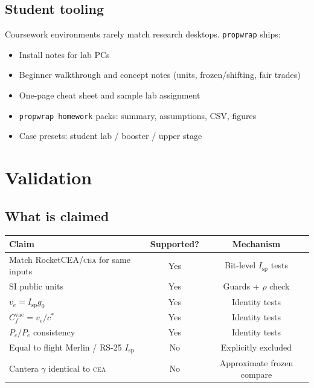 \documentclass[11pt,a4paper]{report}
\newcommand{\pw}{\texttt{propwrap}}
\newcommand{\cea}{\textsc{cea}}
\newcommand{\Isp}{I_{\mathrm{sp}}}
\newcommand{\cstar}{c^{*}}
\newcommand{\Cf}{C_{f}}
\newcommand{\ve}{v_{e}}
\newcommand{\Pc}{P_{c}}
\newcommand{\Pe}{P_{e}}
\newcommand{\gzero}{g_{0}}
\begin{document}
\section{Student tooling}

Coursework environments rarely match research desktops. \pw{} ships:

\begin{itemize}[leftmargin=*]
  \item Install notes for lab PCs
  \item Beginner walkthrough and concept notes (units, frozen/shifting, fair trades)
  \item One-page cheat sheet and sample lab assignment
  \item \texttt{propwrap homework} packs: summary, assumptions, CSV, figures
  \item Case presets: student lab / booster / upper stage
\end{itemize}

\chapter{Validation}
\label{ch:validation}

\section{What is claimed}

\begin{center}
\begin{tabular}{@{}p{7.2cm}cc@{}}
\toprule
Claim & Supported? & Mechanism \\
\midrule
Match RocketCEA/\cea{} for same inputs & Yes & Bit-level $\Isp$ tests \\
SI public units & Yes & Guards + $\rho$ check \\
$\ve=\Isp\gzero$ & Yes & Identity tests \\
$\Cf^{\mathrm{vac}}=\ve/\cstar$ & Yes & Identity tests \\
$\Pc/\Pe$ consistency & Yes & Identity tests \\
Equal to flight Merlin / RS-25 $\Isp$ & No & Explicitly excluded \\
Cantera $\gamma$ identical to \cea{} & No & Approximate frozen compare \\
\bottomrule
\end{tabular}
\end{center}
\end{document}
